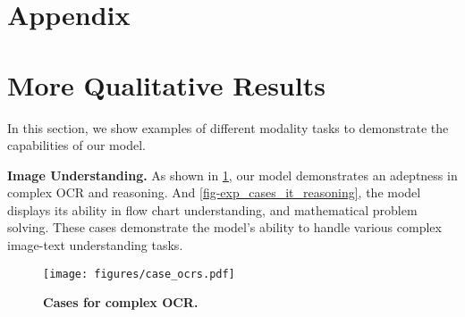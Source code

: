 \renewcommand\thefigure{S\arabic{figure}}
\renewcommand\thetable{S\arabic{table}}
\renewcommand\theequation{S\arabic{equation}}
\renewcommand\thealgorithm{S\arabic{algorithm}}
\setcounter{equation}{0}
\setcounter{table}{0}
\setcounter{figure}{0}
\setcounter{section}{0}
\setcounter{algorithm}{0}
\renewcommand\thesection{\Alph{section}}
\captionsetup[subfigure]{skip=0pt}

\section*{Appendix}

\section{More Qualitative Results}\label{subsec:appendix_cases}

In this section, we show examples of different modality tasks to demonstrate the capabilities of our \method model.

\textbf{Image Understanding.}
As shown in \cref{fig-exp_case_it_ocrs}, our \method model demonstrates an adeptness in complex OCR and reasoning.
And \cref{fig-exp_cases_it_reasoning}, the model displays its ability in flow chart understanding, and mathematical problem solving.
These cases demonstrate the model’s ability to handle various complex image-text understanding tasks.

\begin{figure}[h]
    \centering
    \texttt{[image: figures/case\_ocrs.pdf]}
    \caption{
    \textbf{Cases for complex OCR.}
    }
    \label{fig-exp_case_it_ocrs}
\end{figure}




